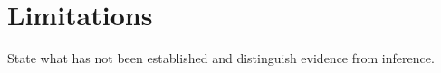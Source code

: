 \section{Limitations}

State what has not been established and distinguish evidence from inference.
